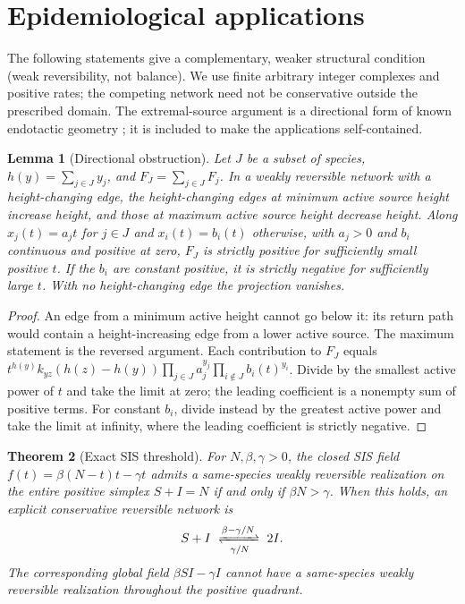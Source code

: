 \documentclass[11pt]{article}
\newtheorem{theorem}{Theorem}[section]
\newtheorem{lemma}[theorem]{Lemma}
\begin{document}
\section{Epidemiological applications}\label{sec:epi}
The following statements give a complementary, weaker structural condition (weak reversibility, not balance). We use finite arbitrary integer complexes and positive rates; the competing network need not be conservative outside the prescribed domain. The extremal-source argument is a directional form of known endotactic geometry \cite{classes,kothari}; it is included to make the applications self-contained.
\begin{lemma}[Directional obstruction]\label{dir}
Let $J$ be a subset of species, $h(y)=\sum_{j\in J}y_j$, and $F_J=\sum_{j\in J}F_j$. In a weakly reversible network with a height-changing edge, the height-changing edges at minimum active source height increase height, and those at maximum active source height decrease height. Along $x_j(t)=a_jt$ for $j\in J$ and $x_i(t)=b_i(t)$ otherwise, with $a_j>0$ and $b_i$ continuous and positive at zero, $F_J$ is strictly positive for sufficiently small positive $t$. If the $b_i$ are constant positive, it is strictly negative for sufficiently large $t$. With no height-changing edge the projection vanishes.
\end{lemma}
\begin{proof}
An edge from a minimum active height cannot go below it: its return path would contain a height-increasing edge from a lower active source. The maximum statement is the reversed argument. Each contribution to $F_J$ equals $t^{h(y)}k_{yz}(h(z)-h(y))\prod_{j\in J}a_j^{y_j}\prod_{i\notin J}b_i(t)^{y_i}$. Divide by the smallest active power of $t$ and take the limit at zero; the leading coefficient is a nonempty sum of positive terms. For constant $b_i$, divide instead by the greatest active power and take the limit at infinity, where the leading coefficient is strictly negative.
\end{proof}
\begin{theorem}[Exact SIS threshold]\label{sis}
For $N,\beta,\gamma>0$, the closed SIS field $f(t)=\beta(N-t)t-\gamma t$ admits a same-species weakly reversible realization on the entire positive simplex $S+I=N$ if and only if $\beta N>\gamma$. When this holds, an explicit conservative reversible network is
\[
S+I\ \xrightleftharpoons[\gamma/N]{\beta-\gamma/N}\ 2I.
\]
The corresponding global field $\beta SI-\gamma I$ cannot have a same-species weakly reversible realization throughout the positive quadrant.
\end{theorem}
\end{document}
